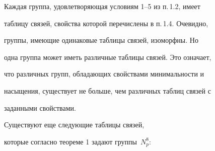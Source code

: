 \begin{pf}


Каждая группа, удовлетворяющая условиям 1--5 из п.\,1.2, имеет 


таблицу связей, свойства которой перечислены в п.\,1.4. Очевидно,


группы, имеющие одинаковые таблицы связей, изоморфны. Но


одна группа может иметь различные таблицы связей. Это означает, 


что различных групп, обладающих свойствами минимальности и


насыщения, существует не больше, чем различных таблиц связей с


заданными свойствами.


\end{pf}





Существуют еще следующие таблицы связей, 


которые согласно теореме 1 задают группы~$N^8_p$:


\smallskip





